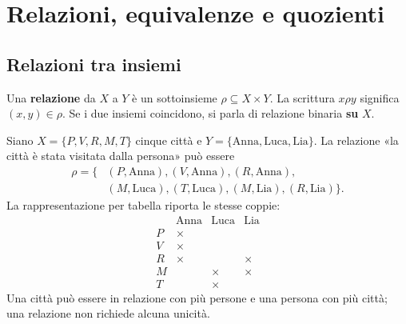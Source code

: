 \chapter{Relazioni, equivalenze e quozienti}

\section{Relazioni tra insiemi}
\begin{definizione}
Una \textbf{relazione} da $X$ a $Y$ è un sottoinsieme $\rho\subseteq X\times Y$. La scrittura $x\rho y$ significa $(x,y)\in\rho$. Se i due insiemi coincidono, si parla di relazione binaria \textbf{su} $X$.
\end{definizione}

\begin{esempio}
Siano $X=\{P,V,R,M,T\}$ cinque città e $Y=\{\text{Anna},\text{Luca},\text{Lia}\}$. La relazione «la città è stata visitata dalla persona» può essere
\[
\begin{split}
\rho=\{&(P,\text{Anna}),(V,\text{Anna}),(R,\text{Anna}),\\
&(M,\text{Luca}),(T,\text{Luca}),(M,\text{Lia}),(R,\text{Lia})\}.
\end{split}
\]
La rappresentazione per tabella riporta le stesse coppie:
\[
\begin{array}{c|ccc}
&\text{Anna}&\text{Luca}&\text{Lia}\\\hline
P&\times&&\\V&\times&&\\R&\times&&\times\\M&&\times&\times\\T&&\times&
\end{array}
\]
Una città può essere in relazione con più persone e una persona con più città; una relazione non richiede alcuna unicità.
\end{esempio}

